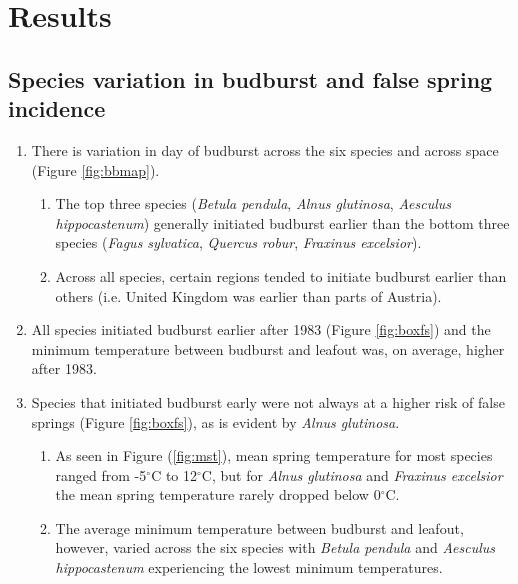 \documentclass{article}\usepackage[]{graphicx}\usepackage[]{color}
\begin{document}
\section*{Results}
\subsection*{Species variation in budburst and false spring incidence}
\begin{enumerate}
\item There is variation in day of budburst across the six species and across space (Figure \ref{fig:bbmap}). 
\begin{enumerate}
\item The top three species (\textit{Betula pendula}, \textit{Alnus glutinosa}, \textit{Aesculus hippocastenum}) generally initiated budburst earlier than the bottom three species (\textit{Fagus sylvatica}, \textit{Quercus robur}, \textit{Fraxinus excelsior}).
\item Across all species, certain regions tended to initiate budburst earlier than others (i.e. United Kingdom was earlier than parts of Austria).
\end{enumerate}
\item All species initiated budburst earlier after 1983 (Figure \ref{fig:boxfs}) and the minimum temperature between budburst and leafout was, on average, higher after 1983. 
\item Species that initiated budburst early were not always at a higher risk of false springs (Figure \ref{fig:boxfs}), as is evident by \textit{Alnus glutinosa}.
\begin{enumerate}
\item As seen in Figure (\ref{fig:mst}), mean spring temperature for most species ranged from -5$^{\circ}$C to 12$^{\circ}$C, but for \textit{Alnus glutinosa} and \textit{Fraxinus excelsior} the mean spring temperature rarely dropped below 0$^{\circ}$C.
\item The average minimum temperature between budburst and leafout, however, varied across the six species with \textit{Betula pendula} and \textit{Aesculus hippocastenum} experiencing the lowest minimum temperatures. 
\end{enumerate}
\end{enumerate}
\end{document}
